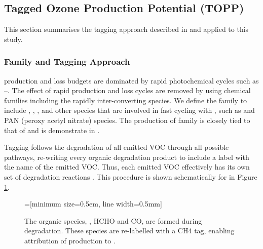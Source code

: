 \subsection{Tagged Ozone Production Potential (TOPP)}
This section summarises the tagging approach described in \citet{Butler:2011} and applied to this study.

\subsubsection[Ox Family and Tagging Approach]{ Family and Tagging Approach} \label{ss:tagging} %

 production and loss budgets are dominated by rapid photochemical cycles such as --.
The effect of rapid production and loss cycles are removed by using chemical families including the rapidly inter-converting species.
We define the  family to include , , ,  and other species that are involved in fast cycling with , such as  and PAN (peroxy acetyl nitrate) species.
The production of  family is closely tied to that of  and is demonstrate in \citet{Butler:2011}.

Tagging follows the degradation of all emitted VOC through all possible pathways, re-writing every organic degradation product to include a label with the name of the emitted VOC.
Thus, each emitted VOC effectively has its own set of degradation reactions \citep{Butler:2011}.
This procedure is shown schematically for  in Figure \ref{f:tagging_approach}.

\begin{figure}
    \centering
    =[minimum size=0.5em, line width=0.5mm]
    \vspace{1mm}
    \caption{The organic species, , HCHO and CO, are formed during  degradation. These species are re-labelled with a CH4 tag, enabling attribution of  production to .}
    \vspace{-4mm}
    \label{f:tagging_approach}
\end{figure} 

